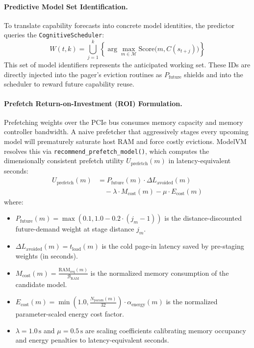 \paragraph{Predictive Model Set Identification.}
To translate capability forecasts into concrete model identities, the predictor queries the \texttt{CognitiveScheduler}:
\begin{equation}
W(t, k) = \bigcup_{j=1}^k \left\{ \arg\max_{m \in \mathcal{M}} \text{Score}\big(m, C(s_{t+j})\big) \right\}
\end{equation}
This set of model identifiers represents the anticipated working set. These IDs are directly injected into the pager's eviction routines as $P_{\text{future}}$ shields and into the scheduler to reward future capability reuse.

\paragraph{Prefetch Return-on-Investment (ROI) Formulation.}
Prefetching weights over the PCIe bus consumes memory capacity and memory controller bandwidth. A naive prefetcher that aggressively stages every upcoming model will prematurely saturate host RAM and force costly evictions. ModelVM resolves this via \texttt{recommend\_prefetch\_model()}, which computes the dimensionally consistent prefetch utility $U_{\text{prefetch}}(m)$ in latency-equivalent seconds:
\begin{equation}
\begin{aligned}
U_{\text{prefetch}}(m) &= P_{\text{future}}(m) \cdot \Delta L_{\text{avoided}}(m) \\
&\quad - \lambda \cdot M_{\text{cost}}(m) - \mu \cdot E_{\text{cost}}(m)
\end{aligned}
\label{eq:prefetch_utility}
\end{equation}
where:
\begin{itemize}
    \item $P_{\text{future}}(m) = \max(0.1, 1.0 - 0.2 \cdot (j_m - 1))$ is the distance-discounted future-demand weight at stage distance $j_m$.
    \item $\Delta L_{\text{avoided}}(m) = t_{\text{load}}(m)$ is the cold page-in latency saved by pre-staging weights (in seconds).
    \item $M_{\text{cost}}(m) = \frac{\text{RAM}_{\text{req}}(m)}{\mathcal{B}_{\text{RAM}}}$ is the normalized memory consumption of the candidate model.
    \item $E_{\text{cost}}(m) = \min(1.0, \frac{N_{\text{param}}(m)}{32}) \cdot \alpha_{\text{energy}}(m)$ is the normalized parameter-scaled energy cost factor.
    \item $\lambda = 1.0\,\text{s}$ and $\mu = 0.5\,\text{s}$ are scaling coefficients calibrating memory occupancy and energy penalties to latency-equivalent seconds.
\end{itemize}

